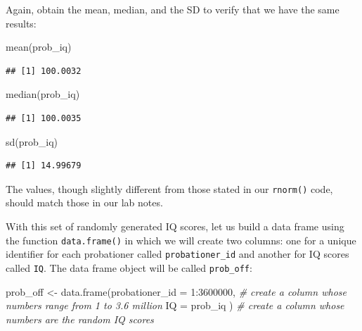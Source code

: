 \documentclass[
]{book}
\newenvironment{Shaded}{\begin{snugshade}}{\end{snugshade}}
\newcommand{\AttributeTok}[1]{\textcolor[rgb]{0.77,0.63,0.00}{#1}}
\newcommand{\CommentTok}[1]{\textcolor[rgb]{0.56,0.35,0.01}{\textit{#1}}}
\newcommand{\DecValTok}[1]{\textcolor[rgb]{0.00,0.00,0.81}{#1}}
\newcommand{\FunctionTok}[1]{\textcolor[rgb]{0.00,0.00,0.00}{#1}}
\newcommand{\NormalTok}[1]{#1}
\newcommand{\OtherTok}[1]{\textcolor[rgb]{0.56,0.35,0.01}{#1}}
\newcommand{\SpecialCharTok}[1]{\textcolor[rgb]{0.00,0.00,0.00}{#1}}
\begin{document}
Again, obtain the mean, median, and the SD to verify that we have the same results:

\begin{Shaded}
\begin{Highlighting}[]
\FunctionTok{mean}\NormalTok{(prob\_iq) }
\end{Highlighting}
\end{Shaded}

\begin{verbatim}
## [1] 100.0032
\end{verbatim}

\begin{Shaded}
\begin{Highlighting}[]
\FunctionTok{median}\NormalTok{(prob\_iq) }
\end{Highlighting}
\end{Shaded}

\begin{verbatim}
## [1] 100.0035
\end{verbatim}

\begin{Shaded}
\begin{Highlighting}[]
\FunctionTok{sd}\NormalTok{(prob\_iq) }
\end{Highlighting}
\end{Shaded}

\begin{verbatim}
## [1] 14.99679
\end{verbatim}

The values, though slightly different from those stated in our \texttt{rnorm()} code, should match those in our lab notes.

With this set of randomly generated IQ scores, let us build a data frame using the function \texttt{data.frame()} in which we will create two columns: one for a unique identifier for each probationer called \texttt{probationer\_id} and another for IQ scores called \texttt{IQ}. The data frame object will be called \texttt{prob\_off}:

\begin{Shaded}
\begin{Highlighting}[]
\NormalTok{prob\_off }\OtherTok{\textless{}{-}} \FunctionTok{data.frame}\NormalTok{(}\AttributeTok{probationer\_id =} \DecValTok{1}\SpecialCharTok{:}\DecValTok{3600000}\NormalTok{,      }\CommentTok{\# create a column whose numbers range from 1 to 3.6 million}
                       \AttributeTok{IQ =}\NormalTok{ prob\_iq )     }\CommentTok{\# create a column whose numbers are the random IQ scores}
\end{Highlighting}
\end{Shaded}
\end{document}
